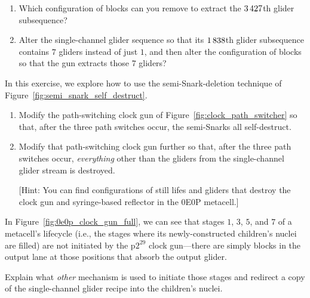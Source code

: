 \begin{multicols}{2}
\begin{problem}
\begin{enumerate}[label=\bf\color{ocre}(\alph*)]
			\item {} Which configuration of blocks can you remove to extract the $3{\,}427$th glider subsequence?
			
			\item {} Alter the single-channel glider sequence so that its $1{\,}838$th glider subsequence contains $7$ gliders instead of just $1$, and then alter the configuration of blocks so that the gun extracts those $7$ gliders?
		\end{enumerate}
	\end{problem}


	\mfilbreak
	
	
	\begin{problem}\label{exer:0e0p_clock_gun_destroy}
		In this exercise, we explore how to use the semi-Snark-deletion technique of Figure~\ref{fig:semi_snark_self_destruct}.\smallskip
		
		\begin{enumerate}[label=\bf\color{ocre}(\alph*)]
			\item {} Modify the path-switching clock gun of Figure~\ref{fig:clock_path_switcher} so that, after the three path switches occur, the semi-Snarks all self-destruct.
			
			\item {} Modify that path-switching clock gun further so that, after the three path switches occur, \emph{everything} other than the gliders from the single-channel glider stream is destroyed.
			
			[Hint: You can find configurations of still lifes and gliders that destroy the clock gun and syringe-based reflector in the 0E0P metacell.]
		\end{enumerate}
	\end{problem}


	\mfilbreak
	
	
	\begin{problem}\label{exer:0e0p_why_blocks_clock_lane} 
		In Figure~\ref{fig:0e0p_clock_gun_full}, we can see that stages $1$, $3$, $5$, and $7$ of a metacell's lifecycle (i.e., the stages where its newly-constructed children's nuclei are filled) are not initiated by the p$2^{29}$ clock gun---there are simply blocks in the output lane at those positions that absorb the output glider.
		
		\noindent Explain what \emph{other} mechanism is used to initiate those stages and redirect a copy of the single-channel glider recipe into the children's nuclei.
	\end{problem}



\end{multicols}
